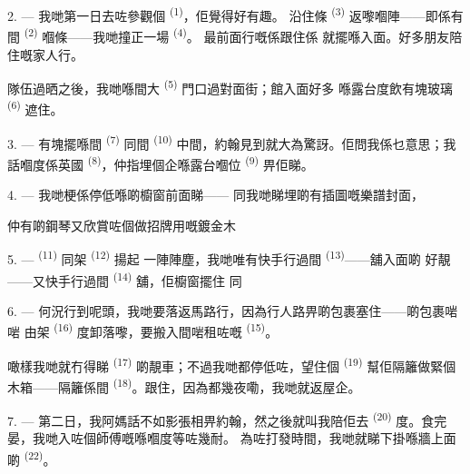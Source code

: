 2. --- 我哋第一日去咗參觀個 \textsuperscript{(1)}，佢覺得好有趣。
沿住條 \textsuperscript{(3)} 返嚟嗰陣——即係有間
\textsuperscript{(2)} 嗰條——我哋撞正一場 \textsuperscript{(4)}。
最前面行嘅係跟住係
就擺喺入面。好多朋友陪住嘅家人行。

隊伍過晒之後，我哋喺間大 \textsuperscript{(5)} 門口過對面街；館入面好多
喺露台度飲有塊玻璃 \textsuperscript{(6)} 遮住。

3. --- 有塊擺喺間 \textsuperscript{(7)} 同間
\textsuperscript{(10)} 中間，約翰見到就大為驚訝。佢問我係乜意思；我話嗰度係英國
 \textsuperscript{(8)}，仲指埋個企喺露台嗰位 \textsuperscript{(9)} 畀佢睇。

\VUsaut{3.0mm}

4. --- 我哋梗係停低喺啲櫥窗前面睇——
同我哋睇埋啲有插圖嘅樂譜封面，

仲有啲鋼琴又欣賞咗個做招牌用嘅鍍金木

5. ---  \textsuperscript{(11)} 同架 \textsuperscript{(12)} 揚起
一陣陣塵，我哋唯有快手行過間 \textsuperscript{(13)}——舖入面啲
好靚——又快手行過間 \textsuperscript{(14)} 舖，佢櫥窗擺住
同

6. --- 何況行到呢頭，我哋要落返馬路行，因為行人路畀啲包裹塞住——啲包裹啱啱
由架 \textsuperscript{(16)} 度卸落嚟，要搬入間啱租咗嘅
\textsuperscript{(15)}。

噉樣我哋就冇得睇 \textsuperscript{(17)} 啲靚車；不過我哋都停低咗，望住個
 \textsuperscript{(19)} 幫佢隔籬做緊個木箱——隔籬係間
\textsuperscript{(18)}。跟住，因為都幾夜嘞，我哋就返屋企。

\VUsaut{3.0mm}

7. --- 第二日，我阿媽話不如影張相畀約翰，然之後就叫我陪佢去
\textsuperscript{(20)} 度。食完晏，我哋入咗個師傅嘅喺嗰度等咗幾耐。
為咗打發時間，我哋就睇下掛喺牆上面啲 \textsuperscript{(22)}。

